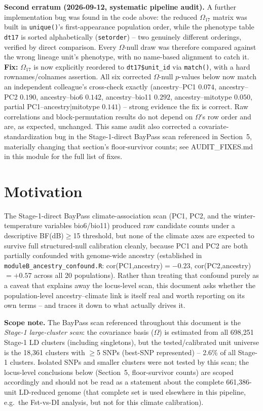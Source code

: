 \documentclass[11pt]{article}
\begin{document}
\textbf{Second erratum (2026-09-12, systematic pipeline audit).} A further implementation
bug was found in the code above: the reduced $\Omega_{17}$ matrix was built in
\texttt{unique()}'s first-appearance population order, while the phenotype table
\texttt{dt17} is sorted alphabetically (\texttt{setorder}) -- two genuinely different
orderings, verified by direct comparison. Every $\Omega$-null draw was therefore compared
against the wrong lineage unit's phenotype, with no name-based alignment to catch it.
\textbf{Fix:} $\Omega_{17}$ is now explicitly reordered to \texttt{dt17\$unit\_id} via
\texttt{match()}, with a hard rownames/colnames assertion. All six corrected $\Omega$-null
$p$-values below now match an independent colleague's cross-check exactly (ancestry--PC1
$0.074$, ancestry--PC2 $0.190$, ancestry--bio6 $0.142$, ancestry--bio11 $0.292$,
ancestry--mitotype $0.050$, partial PC1--ancestry$\mid$mitotype $0.141$) -- strong evidence
the fix is correct. Raw correlations and block-permutation results do not depend on
$\Omega$'s row order and are, as expected, unchanged. This same audit also corrected a
covariate-standardization bug in the Stage-1-direct BayPass scan referenced in Section~5,
materially changing that section's floor-survivor counts; see AUDIT\_FIXES.md in this
module for the full list of fixes.

\section*{\color{Accent}Motivation}

The Stage-1-direct BayPass climate-association scan (PC1, PC2, and the winter-temperature
variables bio6/bio11) produced raw candidate counts under a descriptive BF(dB)$\geq$15
threshold, but none of the climate axes are expected to survive full structured-null
calibration cleanly, because PC1 and PC2 are both partially confounded with genome-wide
ancestry (established in \texttt{moduleB\_ancestry\_confound.R}: cor(PC1,ancestry)$=-0.23$,
cor(PC2,ancestry)$=+0.57$ across all 20 populations). Rather than treating that confound
purely as a caveat that explains away the locus-level scan, this document asks whether the
population-level ancestry--climate link is itself real and worth reporting on its own
terms -- and traces it down to what actually drives it.

\textbf{Scope note.} The BayPass scan referenced throughout this document is the
\emph{Stage-1 large-cluster scan}: the covariance basis ($\Omega$) is estimated from all
698{,}251 Stage-1 LD clusters (including singletons), but the tested/calibrated unit
universe is the 18{,}361 clusters with $\geq$5 SNPs (best-SNP represented) -- 2.6\% of all
Stage-1 clusters. Isolated SNPs and smaller clusters were not tested by this scan; the
locus-level conclusions below (Section~5, floor-survivor counts) are scoped accordingly
and should not be read as a statement about the complete 661{,}386-unit LD-reduced genome
(that complete set is used elsewhere in this pipeline, e.g.\ the Fst-vs-DI analysis, but
not for this climate calibration).
\end{document}
